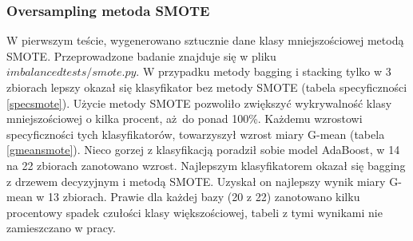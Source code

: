 \subsubsection{Oversampling metoda SMOTE}
W pierwszym teście, wygenerowano sztucznie dane klasy mniejszościowej metodą SMOTE. Przeprowadzone badanie znajduje się w pliku $imbalancedtests/smote.py$. W przypadku metody bagging i stacking tylko w 3 zbiorach lepszy okazał się klasyfikator bez metody SMOTE (tabela specyficzności \ref{specsmote}). Użycie metody SMOTE pozwoliło zwiększyć wykrywalność klasy mniejszościowej o kilka procent, aż do ponad 100\%. Każdemu wzrostowi specyficzności tych klasyfikatorów, towarzyszył wzrost miary G-mean (tabela \ref{gmeansmote}). Nieco gorzej z klasyfikacją poradził sobie model AdaBoost, w 14 na 22 zbiorach zanotowano wzrost. Najlepszym klasyfikatorem okazał się bagging z drzewem decyzyjnym i metodą SMOTE. Uzyskał on najlepszy wynik miary G-mean w 13 zbiorach. Prawie dla każdej bazy (20 z 22) zanotowano kilku procentowy spadek czułości klasy większościowej, tabeli z tymi wynikami nie zamieszczano w pracy.
